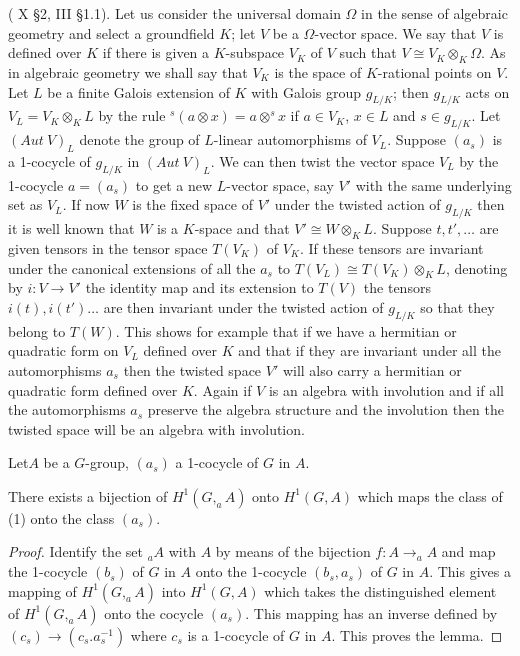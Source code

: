\begin{example*}
 (\cite{keyS1} X \S 2, \cite{keyS2} III \S 1.1). Let
  us consider the 
  universal domain  $\Omega$ in the sense of algebraic geometry and
  select a ground\pageoriginale field $K$; let $V$ be a
  $\Omega$-vector space. We 
  say that $V$ is defined over $K$ if there is given a $K$-subspace
  $V_K$ of $V$ such that $V \cong V_K \otimes_K \Omega$. As in
  algebraic geometry we shall say that $V_K$ is the space of
  $K$-rational points on $V$. Let $L$ be a finite Galois extension of
  $K$ with Galois group $g_{L/K}$; then $g_{L/K}$ acts on $V_L =
  V_{K}\otimes_K L$ by the rule $^{s}(a\otimes x) = a\otimes^s x$ if
  $a\in V_K$, $x\in L$ and $s\in g_{L/K}$. Let $(Aut~V)_L$ denote the
  group of $L$-linear automorphisms of $V_L$. Suppose $(a_s)$ is a
  1-cocycle of $g_{L/K}$ in $(Aut~V)_L$. We can then twist the
  vector space $V_L$ by the 1-cocycle $a=(a_s)$ to get a new
  $L$-vector space, say $V'$ with the same underlying set as $V_L$. If
  now $W$ is the fixed space of $V'$ under the twisted action of
  $g_{L/K}$ then it is well known that $W$ is a $K$-space and that
  $V'\cong W \otimes_K L$. Suppose $t,t',\ldots$ are given tensors
in the tensor space $T(V_K)$ of $V_K$. If these tensors are invariant
under the canonical extensions of all the $a_s$ to $T(V_L)\cong T(V_K)
  \otimes_K L$, denoting by $i:V\rightarrow V'$ the identity map and
  its extension to $T(V)$ the tensors $i(t), i(t')\ldots$ are then
  invariant under the twisted action of $g_{L/K}$ so that they belong
  to $T(W)$. This shows for example that if we have a hermitian or
  quadratic form on $V_L$ defined over $K$ and that if they are
  invariant under all the automorphisms $a_s$ then the twisted space
  $V'$ will also carry a hermitian or quadratic form defined over
  $K$. Again if $V$ is an algebra with involution and if all the
  automorphisms $a_s$ preserve the algebra structure and the
  involution then the twisted space will be an algebra with
  involution. 

Let\pageoriginale $A$ be a $G$-group, $(a_s)$ a 1-cocycle of $G$ in
$A$. 
\end{example*}

\begin{lemma*}
There exists a bijection of $H^1(G,_{a}A)$ onto $H^1(G,A)$ which maps
the class of (1) onto the class $(a_s)$. 
\end{lemma*}

\begin{proof}%
Identify the set $_{a}A$ with $A$ by means of the bijection $f: A
\rightarrow_{a}A$ and map the 1-cocycle $(b_s)$ of $G$ in $A$ onto
the 1-cocycle $(b_s,a_s)$ of $G$ in $A$. This gives a mapping of
$H^1(G,_{a}A)$ into $H^1(G,A)$ which takes the distinguished element
of $H^1(G,_{a}A)$ onto the cocycle $(a_s)$. This mapping has an
inverse defined by $(c_s)\rightarrow (c_s.a^{-1}_s)$ where $c_s$ is a
1-cocycle of $G$ in $A$. This proves the lemma. 
\end{proof}

